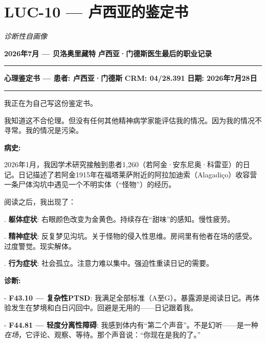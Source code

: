 \section*{\textbf{LUC-10} --- 卢西亚的鉴定书}

\noindent \textit{诊断性自画像}

\noindent \textbf{2026年7月 --- 贝洛奥里藏特}
\noindent \textbf{卢西亚·门德斯医生最后的职业记录}

\vspace{0.5em}\noindent\rule{\textwidth}{0.5pt}\vspace{0.5em}

\noindent \textbf{心理鉴定书 --- 患者: 卢西亚·门德斯}
\noindent \textbf{CRM: 04/28.391}
\noindent \textbf{日期: 2026年7月28日}

\vspace{0.5em}\noindent\rule{\textwidth}{0.5pt}\vspace{0.5em}

\noindent 我正在为自己写这份鉴定书。

\noindent 我知道这不合伦理。但没有任何其他精神病学家能评估我的情况。因为我的情况不寻常。我的情况是污染。

\noindent \textbf{病史:}

\noindent 2026年1月，我因学术研究接触到患者1,260（若阿金·安东尼奥·科雷亚）的日记。日记描述了若阿金1915年在福塔莱萨附近的阿拉加迪索（Alagadiço）收容营一条尸体沟坑中遇见一个不明实体（\textquotedblleft{}怪物\textquotedblright{}）的经历。

\noindent 阅读之后，我出现了：

. \textbf{躯体症状}: 右眼颜色改变为金黄色。持续存在\textquotedblleft{}甜味\textquotedblright{}的感知。慢性疲劳。

. \textbf{精神症状}: 反复梦见沟坑。关于怪物的侵入性思维。房间里有他者在场的感受。过度警觉。现实解体。

. \textbf{行为症状}: 社会孤立。注意力难以集中。强迫性重读日记的需要。

\noindent \textbf{诊断:}

\noindent - \textbf{F43.10 --- 复杂性PTSD}: 我满足全部标准（A至G）。暴露源是阅读日记。再体验发生在梦境和白日闪回中。回避是无用的——日记跟着我。

\noindent - \textbf{F44.81 --- 轻度分离性障碍}: 我感到体内有\textquotedblleft{}第二个声音\textquotedblright{}。不是幻听——是一种\textit{在场}，它评论、观察、等待。那个声音说：\textquotedblleft{}你现在是我的了。\textquotedblright{}

